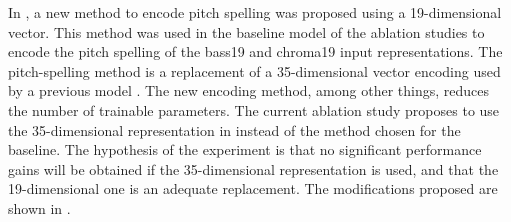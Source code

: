 
In , a new method to encode
pitch spelling was proposed using a 19-dimensional vector.
This method was used in the baseline model of the ablation
studies to encode the pitch spelling of the \gls{bass19} and
\gls{chroma19} input representations. The pitch-spelling
method is a replacement of a 35-dimensional vector encoding
used by a previous model \parencite{micchi2021deep}. The new
encoding method, among other things, reduces the number of
trainable parameters. The current ablation study proposes to
use the 35-dimensional representation in
\textcite{micchi2021deep} instead of the method chosen for
the baseline. The hypothesis of the experiment is that no
significant performance gains will be obtained if the
35-dimensional representation is used, and that the
19-dimensional one is an adequate replacement. The
modifications proposed are shown in .


